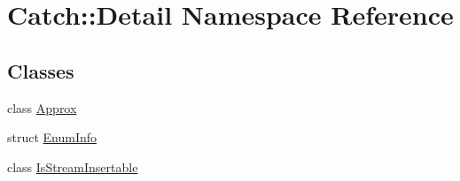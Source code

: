 \hypertarget{namespace_catch_1_1_detail}{}\section{Catch\+::Detail Namespace Reference}
\label{namespace_catch_1_1_detail}
\subsection*{Classes}
\begin{DoxyCompactItemize}
\item 
class \mbox{\hyperlink{class_catch_1_1_detail_1_1_approx}{Approx}}
\item 
struct \mbox{\hyperlink{struct_catch_1_1_detail_1_1_enum_info}{Enum\+Info}}
\item 
class \mbox{\hyperlink{class_catch_1_1_detail_1_1_is_stream_insertable}{Is\+Stream\+Insertable}}
\end{DoxyCompactItemize}
